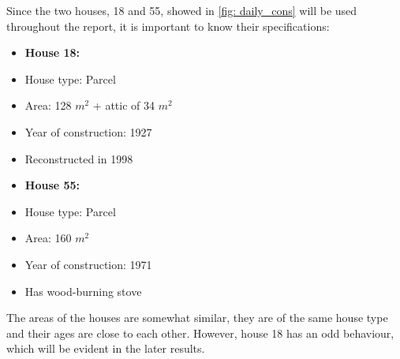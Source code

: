 \noindent Since the two houses, 18 and 55, showed in \cref{fig: daily_cons} will be used throughout the report, it is important to know their specifications:
\begin{multicols}{2}
    \begin{itemize}
        \item[]\textbf{House 18:}
        \item House type: Parcel
        \item Area: 128 $m^2$ + attic of 34 $m^2$
        \item Year of construction: 1927
        \item Reconstructed in 1998
    \end{itemize}
    \columnbreak
    \begin{itemize}
        \item[]\textbf{House 55:}
        \item House type: Parcel
        \item Area: 160 $m^2$ 
        \item Year of construction: 1971
        \item Has wood-burning stove 
    \end{itemize}
\end{multicols}
\noindent The areas of the houses are somewhat similar, they are of the same house type and their ages are close to each other. However, house 18 has an odd behaviour, which will be evident in the later results. \\

